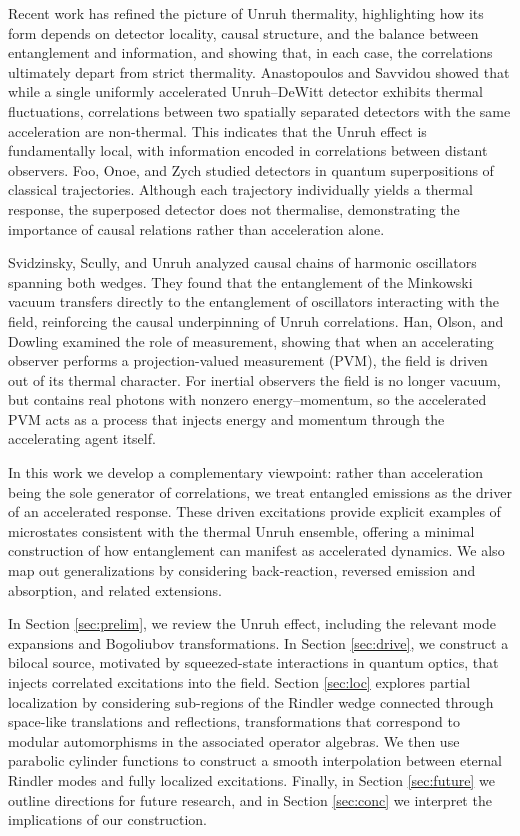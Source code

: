 \documentclass[12pt,a4paper]{article}
\begin{document}
Recent work has refined the picture of Unruh thermality, highlighting how its form depends on detector locality, causal structure, and the balance between entanglement and information, and showing that, in each case, the correlations ultimately depart from strict thermality. Anastopoulos and Savvidou \cite{anastopoulos2012coherences} showed that while a single uniformly accelerated Unruh–DeWitt detector exhibits thermal fluctuations, correlations between two spatially separated detectors with the same acceleration are non-thermal. This indicates that the Unruh effect is fundamentally local, with information encoded in correlations between distant observers. Foo, Onoe, and Zych \cite{foo2020unruh} studied detectors in quantum superpositions of classical trajectories. Although each trajectory individually yields a thermal response, the superposed detector does not thermalise, demonstrating the importance of causal relations rather than acceleration alone.

Svidzinsky, Scully, and Unruh \cite{Svidzinsky2024MinkowskiVEA} analyzed causal chains of harmonic oscillators spanning both wedges. They found that the entanglement of the Minkowski vacuum transfers directly to the entanglement of oscillators interacting with the field, reinforcing the causal underpinning of Unruh correlations. Han, Olson, and Dowling \cite{han2008generating} examined the role of measurement, showing that when an accelerating observer performs a projection-valued measurement (PVM), the field is driven out of its thermal character. For inertial observers the field is no longer vacuum, but contains real photons with nonzero energy–momentum, so the accelerated PVM acts as a process that injects energy and momentum through the accelerating agent itself.

In this work we develop a complementary viewpoint: rather than acceleration being the sole generator of correlations, we treat entangled emissions as the driver of an accelerated response. These driven excitations provide explicit examples of microstates consistent with the thermal Unruh ensemble, offering a minimal construction of how entanglement can manifest as accelerated dynamics. We also map out generalizations by considering back-reaction, reversed emission and absorption, and related extensions.

In Section \ref{sec:prelim}, we review the Unruh effect, including the relevant mode expansions and Bogoliubov transformations. In Section \ref{sec:drive}, we construct a bilocal source, motivated by squeezed-state interactions in quantum optics, that injects correlated excitations into the field. Section \ref{sec:loc} explores partial localization by considering sub-regions of the Rindler wedge connected through space-like translations and reflections, transformations that correspond to modular automorphisms in the associated operator algebras. We then use parabolic cylinder functions to construct a smooth interpolation between eternal Rindler modes and fully localized excitations. Finally, in Section \ref{sec:future} we outline directions for future research, and in Section \ref{sec:conc} we interpret the implications of our construction.
\end{document}
